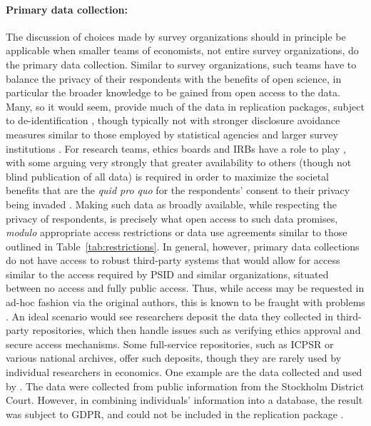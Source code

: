 \documentclass{Revue-economique}
\newcommand{\citep}{\parencite}
\newcommand{\citet}{\textcite}
\begin{document}
\begin{Article} [%
	Titre={Reproducibility and Open Science in Economics},
	Auteur={Lars Vilhuber\thanks{Cornell University, lars.vilhuber@cornell.edu}}]
\begin{refsection}[Main]
\paragraph{Primary data collection:} The discussion of choices made by survey organizations should in principle be applicable when smaller teams of economists, not entire survey organizations, do the primary data collection. Similar to survey organizations, such teams have to balance the privacy of their respondents with the benefits of open science, in particular the broader knowledge to be gained from open access to the data. Many, so it would seem, provide much of the data in replication packages, subject  to de-identification \citep[see ][ for examples]{kopper_j-pal_2020,bjarkefur_development_2021}, though typically not with stronger disclosure avoidance measures similar to those employed by statistical agencies and larger survey institutions \citep[for a brief discussion of the issues and one possible solution, see ][]{mukherjee_assessing_2023}. For research teams, ethics boards and \acp{IRB} have a role to play \citep{grant_opinion_2019}, with some arguing very strongly that greater availability to others (though not blind publication of all data) is required in order to maximize the societal benefits that are the \textit{quid pro quo} for the respondents' consent to their privacy being invaded \citep{meyer_practical_2018,grant_opinion_2019}. Making such data as broadly available, while respecting the privacy of respondents, is precisely what open access to such data promises, \textit{modulo} appropriate access restrictions or data use agreements similar to those outlined in Table~\ref{tab:restrictions}. In general, however, primary data collections do not have access to robust third-party systems that would allow for access similar to the access required by PSID and similar organizations, situated between no access and fully public access. Thus, while access may be requested in ad-hoc fashion via the original authors, this is known to be fraught with problems \citep{watson_many_2022,gabelica_many_2022}. An ideal scenario would see researchers deposit the data they collected in third-party repositories, which then handle issues such as verifying ethics approval and secure access mechanisms. Some full-service repositories, such as \ac{ICPSR} or various national archives, offer such deposits, though they are rarely used by individual researchers in economics.
%
One example are the data collected and used by \citet{ahrsjo_identity_2024}. The data were collected from public information from the Stockholm District Court. However, in combining individuals' information into a database, the result was subject to \ac{GDPR}, and could not be included in the replication package \citep{ahrsjo_code_2024}. 

\end{refsection}
\end{Article}
\end{document}

